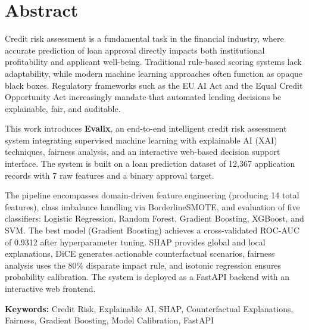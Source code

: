 \documentclass[12pt]{report}
\begin{document}

\chapter*{Abstract\hfill} 

Credit risk assessment is a fundamental task in the financial industry, where accurate prediction of loan approval directly impacts both institutional profitability and applicant well-being. Traditional rule-based scoring systems lack adaptability, while modern machine learning approaches often function as opaque black boxes. Regulatory frameworks such as the EU AI Act and the Equal Credit Opportunity Act increasingly mandate that automated lending decisions be explainable, fair, and auditable.

This work introduces \textbf{Evalix}, an end-to-end intelligent credit risk assessment system integrating supervised machine learning with explainable AI (XAI) techniques, fairness analysis, and an interactive web-based decision support interface. The system is built on a loan prediction dataset of 12,367 application records with 7 raw features and a binary approval target.

The pipeline encompasses domain-driven feature engineering (producing 14 total features), class imbalance handling via BorderlineSMOTE, and evaluation of five classifiers: Logistic Regression, Random Forest, Gradient Boosting, XGBoost, and SVM. The best model (Gradient Boosting) achieves a cross-validated ROC-AUC of 0.9312 after hyperparameter tuning. SHAP provides global and local explanations, DiCE generates actionable counterfactual scenarios, fairness analysis uses the 80\% disparate impact rule, and isotonic regression ensures probability calibration. The system is deployed as a FastAPI backend with an interactive web frontend.

\vspace{0.3cm}
\noindent \textbf{Keywords:} Credit Risk, Explainable AI, SHAP, Counterfactual Explanations, Fairness, Gradient Boosting, Model Calibration, FastAPI


\newpage
\baselineskip1cm
\setcounter{page}{1}
\end{document}
